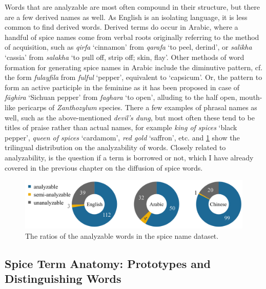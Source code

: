 Words that are analyzable are most often compound in their structure, but there are a few derived names as well. As English is an isolating language, it is less common to find derived words. Derived terms do occur in Arabic, where a handful of spice names come from verbal roots originally referring to the method of acquisition, such as \textit{qirfa} `cinnamon' from \textit{qarafa} `to peel, derind', or \textit{salīkha} `cassia' from \textit{salakha} `to pull off, strip off; skin, flay'. Other methods of word formation for generating spice names in Arabic include the diminutive pattern, cf. the form \textit{fulayfila} from \textit{fulful} `pepper', equivalent to `capsicum'. Or, the pattern to form an active participle in the feminine as it has been proposed in case of \textit{fāghira} `Sichuan pepper' from \textit{faghara} `to open', alluding to the half open, mouth-like pericarps of \textit{Zanthozylum} species. There a few examples of phrasal names as well, such as the above-mentioned \textit{devil's dung}, but most often these tend to be titles of praise rather than  actual names, for example \textit{king of spices} `black pepper', \textit{queen of spices} `cardamom', \textit{red gold} `saffron', etc.  and \cref{fig:analyzability_tripie} show the trilingual distribution on the analyzability of words. Closely related to analyzability, is the question if a term is borrowed or not, which I have already covered in the previous chapter on the diffusion of spice words.

  \begin{figure}[ht!]
    \includegraphics[width=\linewidth]{imgs/plots/analyzability_tripie.pdf}
    \caption{The ratios of the analyzable words in the spice name dataset.}
    \label{fig:analyzability_tripie}
  \end{figure}



\subsection{Spice Term Anatomy: Prototypes and Distinguishing Words}


